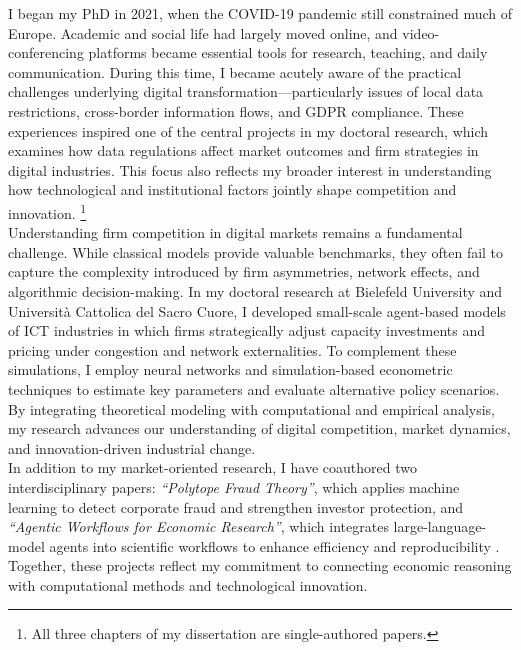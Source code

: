 \documentclass{nfr}
\begin{document}
I began my PhD in 2021, when the COVID-19 pandemic still constrained much of Europe. 
Academic and social life had largely moved online, and video-conferencing platforms became essential tools for research, teaching, and daily communication. 
During this time, I became acutely aware of the practical challenges underlying digital transformation—particularly issues of local data restrictions, cross-border information flows, and GDPR compliance. 
These experiences inspired one of the central projects in my doctoral research, which examines how data regulations affect market outcomes and firm strategies in digital industries. 
This focus also reflects my broader interest in understanding how technological and institutional factors jointly shape competition and innovation.%
\footnote{All three chapters of my dissertation are single-authored papers.}\\

Understanding firm competition in digital markets remains a fundamental challenge. 
While classical models provide valuable benchmarks, they often fail to capture the complexity introduced by firm asymmetries, network effects, and algorithmic decision-making. 
In my doctoral research at Bielefeld University and Università Cattolica del Sacro Cuore, I developed small-scale agent-based models of ICT industries in which firms strategically adjust capacity investments and pricing under congestion and network externalities. 
To complement these simulations, I employ neural networks and simulation-based econometric techniques to estimate key parameters and evaluate alternative policy scenarios. 
By integrating theoretical modeling with computational and empirical analysis, my research advances our understanding of digital competition, market dynamics, and innovation-driven industrial change.\\

In addition to my market-oriented research, I have coauthored two interdisciplinary papers: 
\textit{“Polytope Fraud Theory”}, which applies machine learning to detect corporate fraud and strengthen investor protection, and 
\textit{“Agentic Workflows for Economic Research”}, which integrates large-language-model agents into scientific workflows to enhance efficiency and reproducibility \citep{Zhao2025, Dawid2025}. 
Together, these projects reflect my commitment to connecting economic reasoning with computational methods and technological innovation.\\
\end{document}
